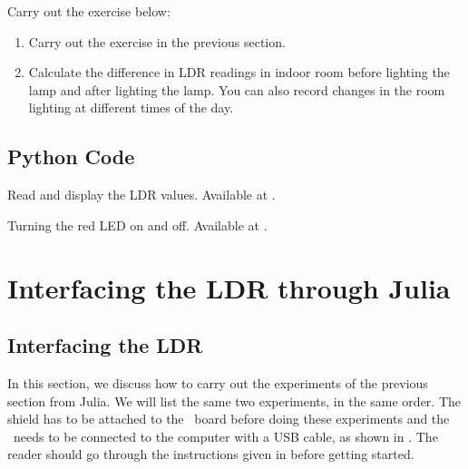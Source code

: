 \begin{exercise}
  Carry out the exercise below:
  \begin{enumerate}
    \item Carry out the exercise in the previous section.
    \item Calculate the difference in LDR readings in indoor room
          before lighting the lamp and after lighting the lamp. You can also
          record changes in the room lighting at different times of the day.
  \end{enumerate}
\end{exercise}

\subsection{Python Code}
\label{sec:ldr-python-code}

\begin{pycode}
  {Read and display the LDR values.  Available at
    .}
  \label{py:ldr-read}
  
\end{pycode}

\begin{pycode}
  {Turning the red LED on and off.  Available at
    .}
  \label{py:ldr-led}
  
\end{pycode}

\section{Interfacing the LDR through Julia}
\subsection{Interfacing the LDR}
In this section, we discuss how to carry out the experiments of the
previous section from Julia.  We will list the same two experiments,
in the same order.  The shield has to be attached to the \arduino\ board
before doing these experiments and the \arduino\ needs to be connected to the computer 
with a USB cable, as shown in .
The reader should go through the instructions given in  before getting started.


